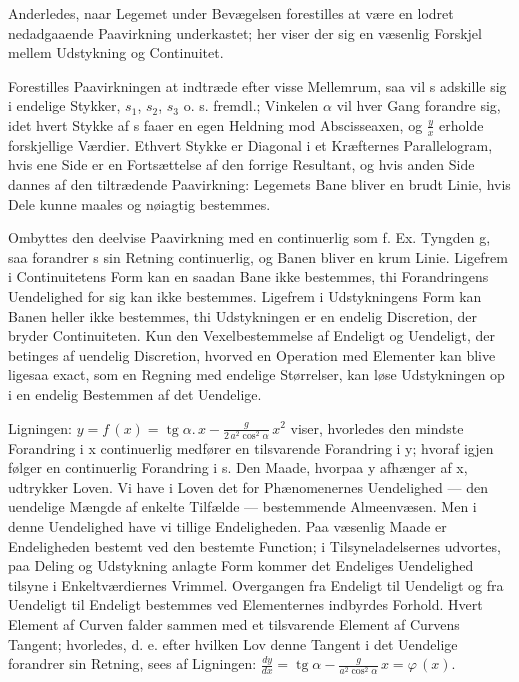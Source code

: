 \documentclass[12pt,a4paper]{book}
\begin{document}
Anderledes, naar Legemet under Bevægelsen forestilles at være en lodret
nedadgaaende Paavirkning underkastet; her viser der sig en væsenlig
Forskjel mellem Udstykning og Continuitet.

Forestilles Paavirkningen at indtræde efter visse Mellemrum, saa vil s
adskille sig i endelige Stykker, $s_1$, $s_2$, $s_3$ o. s. fremdl.;
Vinkelen $\alpha$ vil hver Gang forandre sig, idet hvert Stykke af s
faaer en egen Heldning mod Abscisseaxen, og $\frac{y}{x}$ erholde
forskjellige Værdier. Ethvert Stykke er Diagonal i et Kræfternes
Parallelogram, hvis ene Side er en Fortsættelse af den forrige
Resultant, og hvis anden Side dannes af den tiltrædende Paavirkning:
Legemets Bane bliver en brudt Linie, hvis Dele kunne maales og nøiagtig
bestemmes.

Ombyttes den deelvise Paavirkning med en continuerlig som f. Ex. Tyngden
g, saa forandrer s sin Retning continuerlig, og Banen bliver en krum
Linie. Ligefrem i Continuitetens Form kan en saadan Bane ikke bestemmes,
thi Forandringens Uendelighed for sig kan ikke bestemmes. Ligefrem i
Udstykningens Form kan Banen heller ikke bestemmes, thi Udstykningen er
en endelig Discretion, der bryder Continuiteten. Kun den
Vexelbestemmelse af Endeligt og Uendeligt, der betinges af uendelig
Discretion, hvorved en Operation med Elementer kan blive ligesaa exact,
som en Regning med endelige Størrelser, kan løse Udstykningen op i en
endelig Bestemmen af det Uendelige.

Ligningen: $y = f\,(x) = \operatorname{tg} \alpha .\, x -
\frac{g}{2\,a^2 \cos^2 \alpha}\, x^2$
viser, hvorledes den mindste Forandring i x continuerlig medfører en
tilsvarende Forandring i y; hvoraf igjen følger en continuerlig
Forandring i s. Den Maade, hvorpaa y afhænger af x, udtrykker Loven. Vi
have i Loven det for Phænomenernes Uendelighed --- den uendelige Mængde
af enkelte Tilfælde --- bestemmende Almeenvæsen. Men i denne Uendelighed
have vi tillige Endeligheden. Paa væsenlig Maade er Endeligheden
bestemt ved den bestemte Function; i Tilsyneladelsernes udvortes, paa
Deling og Udstykning anlagte Form kommer det Endeliges Uendelighed
tilsyne i Enkeltværdiernes Vrimmel. Overgangen fra Endeligt til
Uendeligt og fra Uendeligt til Endeligt bestemmes ved Elementernes
indbyrdes Forhold. Hvert Element af Curven falder sammen med et
tilsvarende Element af Curvens Tangent; hvorledes, d. e. efter hvilken
Lov denne Tangent i det Uendelige forandrer sin Retning, sees af
Ligningen: $\frac{dy}{dx} = \operatorname{tg} \alpha -
\frac{g}{a^2 \cos^2 \alpha}\, x = \varphi\,(x)$.
\end{document}
